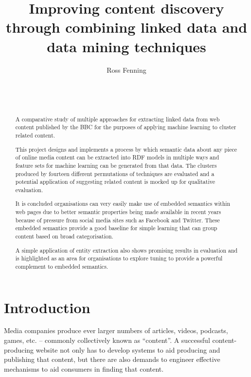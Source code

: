 \documentclass{sig-alternate-05-2015}
\begin{document}
\title{Improving content discovery through combining linked data and data mining techniques}

\author{
\alignauthor
Ross Fenning\\
       \\
       \\
       \\
}

\maketitle
\begin{abstract}
A comparative study of multiple approaches for extracting linked data
from web content published by the BBC for the purposes of applying
machine learning to cluster related content.

This project designs and implements a process by which semantic data
about any piece of online media content can be extracted into RDF
models in
multiple ways and feature
sets for machine learning can be generated from
that data. The clusters produced by fourteen different permutations
of techniques are evaluated and a potential application of suggesting
related content is mocked up for qualitative evaluation.

It is concluded organisations can very easily make use of
embedded semantics within web pages due to better semantic properties
being made available in recent years because of pressure from
social media sites such as Facebook and Twitter.
These embedded semantics provide a good baseline for simple
learning that can group content based on broad categorisation.

A simple application of entity extraction also shows promising results in
evaluation and is highlighted as an area for organisations to explore
tuning to provide a powerful complement to embedded semantics.
\end{abstract}

\section{Introduction}

Media companies produce ever larger numbers of articles, videos, podcasts,
games, etc. -- commonly collectively known as ``content''. A successful
content-producing website not only has to develop systems to aid producing and
publishing that content, but there are also demands to engineer effective
mechanisms to aid consumers in finding that content.
\end{document}
